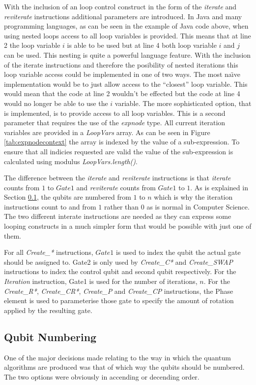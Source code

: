 With the inclusion of an loop control construct in the form of the \emph{iterate} and \emph{reviterate} instructions additional parameters are introduced.
In Java and many programming languages, as can be seen in the example of Java code above, when using nested loops access to all loop variables is provided.
This means that at line 2 the loop variable $i$ is able to be used but at line 4 both loop variable $i$ and $j$ can be used.
This nesting is quite a powerful language feature.
With the inclusion of the iterate instructions and therefore the posibility of nested iterations this loop variable access could be implemented in one of two ways.
The most na\"{\i}ve implementation would be to just allow access to the ``closest'' loop variable.
This would mean that the code at line 2 wouldn't be effected but the code at line 4 would no longer be able to use the $i$ variable.
The more sophisticated option, that is implemented, is to provide access to all loop variables.
This is a second parameter that requires the use of the \emph{expnode} type.
All current iteration variables are provided in a \emph{LoopVars} array.
As can be seen in Figure \ref{tab:expnodecontext} the array is indexed by the value of a sub-expression.
To ensure that all indicies requested are valid the value of the sub-expression is calculated using modulus \emph{LoopVars.length()}.

The difference between the \emph{iterate} and \emph{reviterate} instructions is that \emph{iterate} counts from $1$ to $Gate1$ and \emph{reviterate} counts from $Gate1$ to $1$.
As is explained in Section \ref{sec:qubitnum}, the qubits are numbered from $1$ to $n$ which is why the iteration instructions count to and from $1$ rather than $0$ as is normal in Computer Science.
The two different interate instructions are needed as they can express some looping constructs in a much simpler form that would be possible with just one of them.

For all \emph{Create\_*} instructions, $Gate1$ is used to index the qubit the actual gate should be assigned to.
Gate2 is only used by \emph{Create\_C*} and \emph{Create\_SWAP} instructions to index the control qubit and second qubit respectively.
For the \emph{Iteration} instruction, Gate1 is used for the number of iterations, $n$.
For the \emph{Create\_R*}, \emph{Create\_CR*}, \emph{Create\_P} and  \emph{Create\_CP} instructions, the Phase element is used to parameterise those gate to specify the amount of rotation applied by the resulting gate.


\subsection{Qubit Numbering}
\label{sec:qubitnum}
One of the major decisions made relating to the way in which the quantum algorithms are produced was that of which way the qubits should be numbered.
The two options were obviously in accending or decending order.


